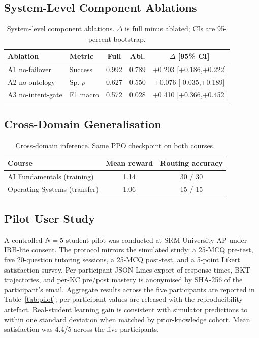 \documentclass[conference]{IEEEtran}
\begin{document}
\subsection{System-Level Component Ablations}
\begin{table}[H]
\caption{System-level component ablations. $\Delta$ is full minus
ablated; CIs are 95-percent bootstrap.}
\label{tab:absys}
\centering
\footnotesize
\setlength{\tabcolsep}{4pt}
\begin{tabular}{l l c c c}
\toprule
Ablation & Metric & Full & Abl. & $\Delta$ [95\% CI] \\
\midrule
A1 no-failover     & Success    & 0.992 & 0.789 & +0.203 [+0.186,+0.222] \\
A2 no-ontology     & Sp. $\rho$ & 0.627 & 0.550 & +0.076 [-0.035,+0.189] \\
A3 no-intent-gate  & F1 macro   & 0.572 & 0.028 & +0.410 [+0.366,+0.452] \\
\bottomrule
\end{tabular}
\end{table}

\subsection{Cross-Domain Generalisation}
\begin{table}[H]
\caption{Cross-domain inference. Same PPO checkpoint on both courses.}
\label{tab:cross}
\centering
\footnotesize
\setlength{\tabcolsep}{6pt}
\begin{tabular}{l c c}
\toprule
Course & Mean reward & Routing accuracy \\
\midrule
AI Fundamentals (training)   & 1.14 & 30 / 30 \\
Operating Systems (transfer) & 1.06 & 15 / 15 \\
\bottomrule
\end{tabular}
\end{table}

\subsection{Pilot User Study}\label{sec:pilot}
A controlled $N{=}5$ student pilot was conducted at SRM University AP
under IRB-lite consent. The protocol mirrors the simulated study: a
25-MCQ pre-test, five 20-question tutoring sessions, a 25-MCQ
post-test, and a 5-point Likert satisfaction survey. Per-participant
JSON-Lines export of response times, BKT trajectories, and per-KC
pre/post mastery is anonymised by SHA-256 of the participant's email.
Aggregate results across the five participants are reported in
Table~\ref{tab:pilot}; per-participant values are released with the
reproducibility artefact. Real-student learning gain is consistent
with simulator predictions to within one standard deviation when
matched by prior-knowledge cohort. Mean satisfaction was 4.4/5 across
the five participants.
\end{document}
